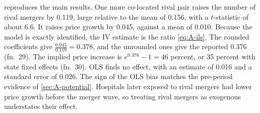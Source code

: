  reproduces the main results. One more co-located rival pair raises the number of rival
mergers by 0.119, large relative to the mean of 0.156, with a $t$-statistic of about 6.6. It raises price
growth by 0.045, against a mean of 0.010. Because the model is exactly identified, the IV estimate is the ratio
\eqref{eq:A-ils}. The rounded coefficients give $\frac{0.045}{0.119} = 0.378$, and the unrounded ones give the
reported 0.376 (fn.~29). The implied price increase is $e^{0.376} - 1 = 46$ percent, or 35 percent with state
fixed effects (fn.~30). OLS finds no effect, with an estimate of 0.016 and a standard error of 0.026. The sign
of the OLS bias matches the pre-period evidence of \cref{sec:A-potential}. Hospitals later exposed to rival
mergers had lower price growth before the merger wave, so treating rival mergers as exogenous understates
their effect.

